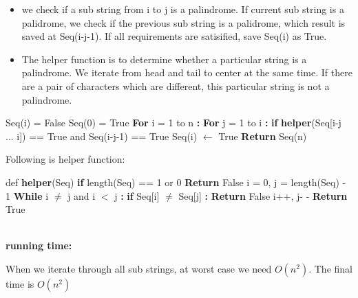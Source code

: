 \documentclass[12pt]{article}
\begin{document}
\begin{itemize}
  \item we check if a sub string from i to j is a palindrome. 
	If current sub string is a palidrome, we check if the previous sub string is a palidrome, which result is saved at Seq(i-j-1).
	If all requirements are satisified, save Seq(i) as True.
  \item The helper function is to determine whether a particular string is a palindrome. 
	We iterate from head and tail to center at the same time. 
	If there are a pair of characters which are different, this particular string is not a palindrome.
\end{itemize}

\begin{algorithm}
\begin{algorithmic}
\State Seq(i) = False
\State Seq(0) = True
\State \textbf{For} i = 1 to n \textbf{:}
\State \hspace{0.4cm} \textbf{For} j = 1 to i \textbf{:}
\State \hspace{0.8cm} \textbf{if} \textbf{helper}(Seq[i-j ... i]) == True and Seq(i-j-1) == True
\State \hspace{1.2cm} Seq(i) $\leftarrow$ True
\State \textbf{Return} Seq(n)
\end{algorithmic}
\end{algorithm}
Following is helper function: 
\begin{algorithm}
\begin{algorithmic}
\State def \textbf{helper}(Seq)
\State \hspace{0.4cm} \textbf{if} length(Seq) == 1 or 0
\State \hspace{0.8cm} \textbf{Return} False
\State \hspace{0.4cm} i = 0, j = length(Seq) - 1
\State \hspace{0.4cm} \textbf{While} i $\not=$ j and i $<$ j \textbf{:} 
\State \hspace{0.8cm} \textbf{if} Seq[i] $\not=$ Seq[j] \textbf{:}
\State \hspace{1.2cm} \textbf{Return} False
\State \hspace{0.8cm} i++, j- -
\State \hspace{0.4cm} \textbf{Return} True
\end{algorithmic}
\end{algorithm}
\noindent \\
\textbf{running time:} \par 
When we iterate through all sub strings, at worst case we need $O(n^2)$.
The final time is $O(n^2)$
\end{document}
